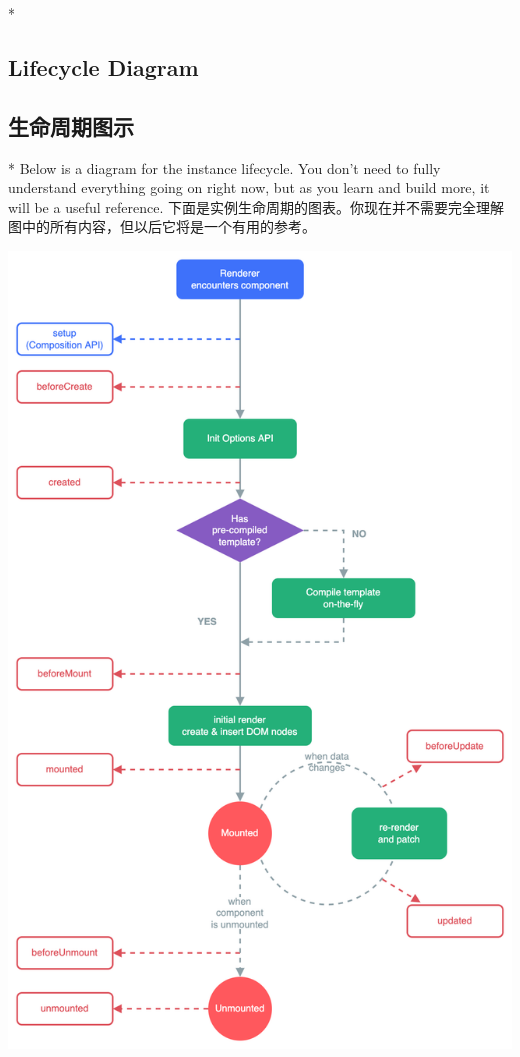 \begin{paracol}{2}
\switchcolumn[0]*%
\subsection{Lifecycle Diagram}
\switchcolumn
\subsection{生命周期图示}
\switchcolumn[0]*%
Below is a diagram for the instance lifecycle. You don't need to fully
understand everything going on right now, but as you learn and build
more, it will be a useful reference.
\switchcolumn
下面是实例生命周期的图表。你现在并不需要完全理解图中的所有内容，但以后它将是一个有用的参考。
\end{paracol}

\begin{center} 
\includegraphics[scale=0.3]{./img/lifecycle.16e4c08e.png} 
\end{center}

\begin{paracol}{2}

\end{paracol}



